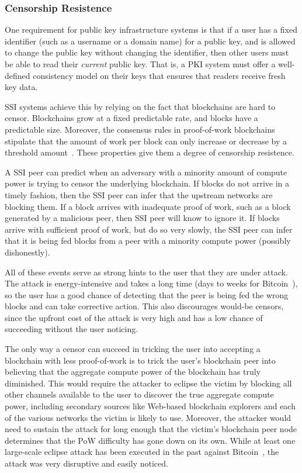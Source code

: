 \subsubsection{Censorship Resistence}

One requirement for public key infrastructure systems is that if a user has a
fixed identifier (such as a username or a domain name) for a public key, and is
allowed to change the public key without changing the identifier, 
then other users must be able to read their \emph{current}
public key.  That is, a PKI system must offer a well-defined consistency model
on their keys that ensures that readers receive fresh key data.

SSI systems achieve this by relying on the fact that blockchains are hard to
censor.  Blockchains grow at a fixed
predictable rate, and blocks have a predictable size.  Moreover,
the consensus rules in proof-of-work blockchains stipulate that 
the amount of work per block can only increase or decrease by a threshold
amount~\cite{bitcoin-difficulty-adjustment-rules}.  These properties give them a
degree of censorship resistence.

A SSI peer can predict when an adversary with a minority amount of compute power
is trying to censor the underlying blockchain.  If
blocks do not arrive in a timely fashion, then the SSI peer can infer that the upstream
networks are blocking them.  If a block arrives with inadequate proof of work,
such as a block generated by a malicious peer, then SSI peer will know to ignore
it.  If blocks arrive with sufficient proof of work, but do so very slowly, the
SSI peer can infer that it is being fed blocks from a peer with a minority
compute power (possibly dishonestly).

All of these events serve as strong hints to the user that they are under
attack.  The attack is energy-intensive and takes a long time (days to weeks for
Bitcoin~\cite{bitcoin-difficulty-adjustment-rules}),
so the user has a good chance of detecting that the peer is being fed the wrong
blocks and can take corrective action.  This also discourages would-be censors,
since the upfront cost of the attack is very high and has a low chance of
succeeding without the user noticing.

The only way a censor can succeed in tricking the user into accepting a
blockchain with less proof-of-work
is to trick the user's blockchain peer into believing that the aggregate compute
power of the blockchain has truly diminished.  This would require the attacker
to eclipse the victim by blocking all other channels available to the user to discover the true aggregate
compute power, including secondary sources like Web-based blockchain explorers
and each of the various networks the victim is likely to use.
Moreover, the attacker would need to sustain the attack for long
enough that the victim's blockchain peer node determines that the PoW difficulty
has gone down on its own.  While at least one large-scale eclipse attack
has been executed in the past against
Bitcoin~\cite{bitcoin-bgp-attack}, the attack was very disruptive and easily
noticed.

